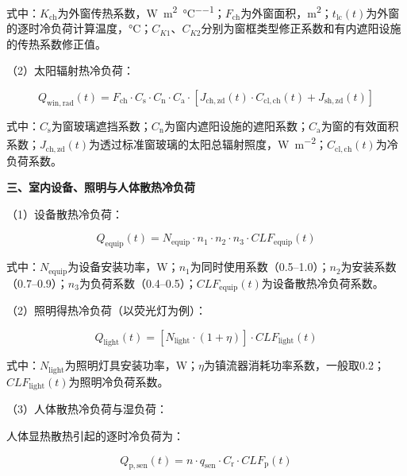 式中：$K_{\mathrm{ch}}$为外窗传热系数，\si{W\per\square\meter\per\degreeCelsius}；$F_{\mathrm{ch}}$为外窗面积，\si{\square\meter}；$t_{\mathrm{lc}}(t)$为外窗的逐时冷负荷计算温度，\si{\degreeCelsius}；$C_{K1}$、$C_{K2}$分别为窗框类型修正系数和有内遮阳设施的传热系数修正值。

（2）太阳辐射热冷负荷：

\begin{equation}
Q_{\mathrm{win,rad}}(t)=F_{\mathrm{ch}}\cdot C_{\mathrm{s}}\cdot C_{\mathrm{n}}\cdot C_{\mathrm{a}}\cdot\left[J_{\mathrm{ch,zd}}(t)\cdot C_{\mathrm{cl,ch}}(t)+J_{\mathrm{sh,zd}}(t)\right]
\label{eq:win-rad}
\end{equation}

式中：$C_{\mathrm{s}}$为窗玻璃遮挡系数；$C_{\mathrm{n}}$为窗内遮阳设施的遮阳系数；$C_{\mathrm{a}}$为窗的有效面积系数；$J_{\mathrm{ch,zd}}(t)$为透过标准窗玻璃的太阳总辐射照度，\si{W\per\square\meter}；$C_{\mathrm{cl,ch}}(t)$为冷负荷系数。

\textbf{三、室内设备、照明与人体散热冷负荷}

（1）设备散热冷负荷：

\begin{equation}
Q_{\mathrm{equip}}(t)=N_{\mathrm{equip}}\cdot n_{1}\cdot n_{2}\cdot n_{3}\cdot CLF_{\mathrm{equip}}(t)
\label{eq:equip}
\end{equation}

式中：$N_{\mathrm{equip}}$为设备安装功率，\si{W}；$n_{1}$为同时使用系数（0.5--1.0）；$n_{2}$为安装系数（0.7--0.9）；$n_{3}$为负荷系数（0.4--0.5）；$CLF_{\mathrm{equip}}(t)$为设备散热冷负荷系数。

（2）照明得热冷负荷（以荧光灯为例）：

\begin{equation}
Q_{\mathrm{light}}(t)=\left[N_{\mathrm{light}}\cdot(1+\eta)\right]\cdot CLF_{\mathrm{light}}(t)
\label{eq:light}
\end{equation}

式中：$N_{\mathrm{light}}$为照明灯具安装功率，\si{W}；$\eta$为镇流器消耗功率系数，一般取0.2；$CLF_{\mathrm{light}}(t)$为照明冷负荷系数。

（3）人体散热冷负荷与湿负荷：

人体显热散热引起的逐时冷负荷为：

\begin{equation}
Q_{\mathrm{p,sen}}(t)=n\cdot q_{\mathrm{sen}}\cdot C_{\mathrm{r}}\cdot CLF_{\mathrm{p}}(t)
\label{eq:p-sen}
\end{equation}

